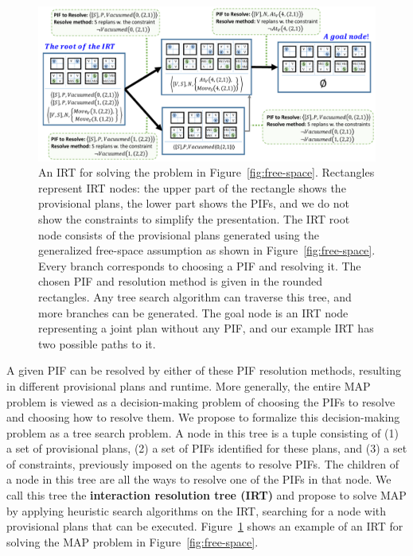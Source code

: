 \documentclass[11pt]{article}
\begin{document}
\begin{figure}%
\centering
\includegraphics[width=0.8\columnwidth]{IRT-example_cropped}%
\vspace{-0.4cm}
\caption{{\small An IRT for solving the problem in Figure~\ref{fig:free-space}. Rectangles represent IRT nodes: the upper part of the rectangle shows the provisional plans, the lower part shows the PIFs, and we do not show the constraints to simplify the presentation. The IRT root node consists of the provisional plans generated using the generalized free-space assumption as shown in Figure~\ref{fig:free-space}. Every branch corresponds to choosing a PIF and resolving it. The chosen PIF and resolution method is given in the rounded rectangles. Any tree search algorithm can traverse this tree, and more branches can be generated. The goal node is an IRT node representing a joint plan without any PIF, and our example IRT has two possible paths to it.}}
\label{fig:irt-example}%
\end{figure}

A given PIF can be resolved by either of these  PIF resolution methods, resulting in different provisional plans and runtime. More generally, the entire MAP problem is viewed as a decision-making problem of choosing the PIFs to resolve and choosing how to resolve them. We propose to formalize this decision-making problem as a tree search problem. A node in this tree is a tuple consisting of (1) a set of provisional plans, (2) a set of PIFs identified for these plans, and (3) a set of constraints, previously imposed on the agents to resolve PIFs. The children of a node in this tree are all the ways to resolve one of the PIFs in that node. 
We call this tree the {\bf interaction resolution tree (IRT)} and propose to solve MAP by applying heuristic search algorithms on the IRT, searching for a node with provisional plans that can be executed. 
Figure~\ref{fig:irt-example} shows an example of an IRT for solving the MAP problem in Figure~\ref{fig:free-space}. 

\end{document}
